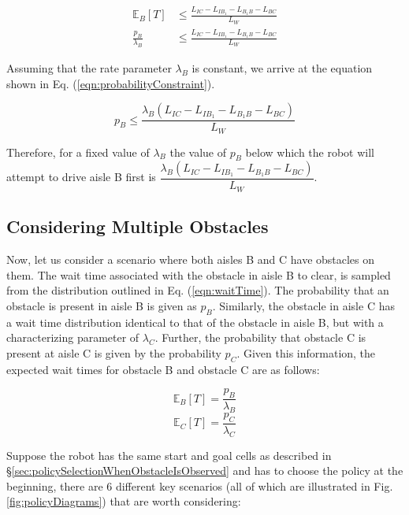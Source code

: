 \documentclass[a4paper,12pt]{article}
\begin{document}
			\begin{equation}
			\begin{split}
			\mathbb{E}_{B}[T] &\leq \frac{L_{IC}-L_{IB_1}-L_{B_1B}-L_{BC}}{L_W} \\
			\frac{p_B}{\lambda_B} &\leq \frac{L_{IC}-L_{IB_1}-L_{B_1B}-L_{BC}}{L_W}
			\end{split}
			\label{eqn:probabilityInequality1}
			\end{equation}
			
			Assuming that the rate parameter $\lambda_B$ is constant, we arrive at the equation shown in Eq. (\ref{eqn:probabilityConstraint}).
			
			\begin{equation}
			p_B \leq \frac{\lambda_B\left(L_{IC}-L_{IB_1}-L_{B_1B}-L_{BC}\right)}{L_W}
			\label{eqn:probabilityConstraint}
			\end{equation}
			
			Therefore, for a fixed value of $\lambda_B$ the value of $ p_B $ below which the robot will attempt to drive aisle B first is $ \dfrac{\lambda_B\left(L_{IC}-L_{IB_1}-L_{B_1B}-L_{BC}\right)}{L_W} $.
		
		\subsection{Considering Multiple Obstacles}
		\label{sec:consideringMultipleObstacles}
		
			Now, let us consider a scenario where both aisles B and C have obstacles on them. The wait time associated with the obstacle in aisle B to clear, is sampled from the distribution outlined in Eq. (\ref{eqn:waitTime}). The probability that an obstacle is present in aisle B is given as $p_B$. Similarly, the obstacle in aisle C has a wait time distribution identical to that of the obstacle in aisle B, but with a characterizing parameter of $\lambda_C$. Further, the probability that obstacle C is present at aisle C is given by the probability $p_C$. Given this information, the expected wait times for obstacle B and obstacle C are as follows:
			
			\begin{equation}
			\mathbb{E}_{B}[T] = \frac{p_B}{\lambda_B}
			\end{equation}
			\begin{equation}
			\mathbb{E}_{C}[T] = \frac{p_C}{\lambda_C} 
			\label{eqn:expectedWaitTimeBC}
			\end{equation}
			
			Suppose the robot has the same start and goal cells as described in \S \ref{sec:policySelectionWhenObstacleIsObserved} and has to choose the policy at the beginning, there are 6 different key scenarios (all of which are illustrated in Fig. \ref{fig:policyDiagrams}) that are worth considering:
			
\end{document}
